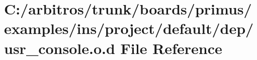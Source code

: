 \hypertarget{ins_2project_2default_2dep_2usr__console_8o_8d}{\section{C\-:/arbitros/trunk/boards/primus/examples/ins/project/default/dep/usr\-\_\-console.o.\-d File Reference}
\label{ins_2project_2default_2dep_2usr__console_8o_8d}
}
